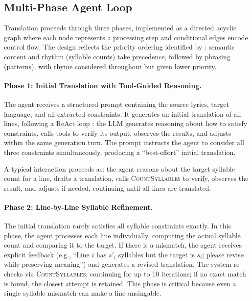 \documentclass[11pt]{article}
\begin{document}
\subsection{Multi-Phase Agent Loop}
\label{sec:loop}

Translation proceeds through three phases, implemented as a directed acyclic graph where each node represents a processing step and conditional edges encode control flow.
The design reflects the priority ordering identified by \citet{low-2005-pentathlon}: semantic content and rhythm (syllable counts) take precedence, followed by phrasing (patterns), with rhyme considered throughout but given lower priority.

\paragraph{Phase 1: Initial Translation with Tool-Guided Reasoning.}
The agent receives a structured prompt containing the source lyrics, target language, and all extracted constraints.
It generates an initial translation of all lines, following a ReAct loop \citep{yao-etal-2023-react}: the LLM generates reasoning about how to satisfy constraints, calls tools to verify its output, observes the results, and adjusts within the same generation turn.
The prompt instructs the agent to consider all three constraints simultaneously, producing a ``best-effort'' initial translation.

A typical interaction proceeds as: the agent reasons about the target syllable count for a line, drafts a translation, calls \textsc{CountSyllables} to verify, observes the result, and adjusts if needed, continuing until all lines are translated.

\paragraph{Phase 2: Line-by-Line Syllable Refinement.}
The initial translation rarely satisfies all syllable constraints exactly.
In this phase, the agent processes each line individually, computing the actual syllable count and comparing it to the target.
If there is a mismatch, the agent receives explicit feedback (e.g., ``Line $i$ has $s'_i$ syllables but the target is $s_i$; please revise while preserving meaning'') and generates a revised translation.
The system re-checks via \textsc{CountSyllables}, continuing for up to 10 iterations; if no exact match is found, the closest attempt is retained.
This phase is critical because even a single syllable mismatch can make a line unsingable.
\end{document}
